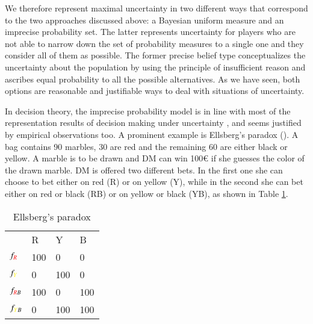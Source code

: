 \documentclass[fleqn,reqno,11pt]{article}
\begin{document}
We therefore represent maximal uncertainty in two different ways that correspond to the two
approaches discussed above: a Bayesian uniform measure and an imprecise probability
set. The latter represents uncertainty for players who are not able to narrow down the set of
probability measures to a single one and they consider all of them as possible. The former
precise belief type conceptualizes the uncertainty about the population by using the principle
of insufficient reason and ascribes equal probability to all the possible alternatives. As we
have seen, both options are reasonable and justifiable ways to deal with situations of
uncertainty.

In decision theory, the imprecise probability model is in line with most of the representation
results of decision making under uncertainty \citep[e.g.,][]{gilsch89,KlibMarMuk05,GhirMar02},
and seems justified by empirical observations too. A prominent example is Ellsberg's paradox
(\citet{ells61}). A bag contains 90 marbles, 30 are red and the remaining 60 are either black
or yellow. A marble is to be drawn and DM can win 100€ if she guesses the color of the drawn
marble. DM is offered two different bets. In the first one she can choose to bet either on
red (R) or on yellow (Y), while in the second she can bet either on red or black (RB) or on
yellow or black (YB), as shown in Table \ref{Ellsberg}.



\begin{table}[h]
\centering
\begin{tabular}{@{}llll@{}}
\cmidrule(l){2-4}
\multicolumn{1}{c}{} & {\color{red}R}   & {\color{yellow}Y}   & B   \\ \cmidrule(l){2-4} 
$f_{{\color{red}R}}$              & 100 & 0   & 0   \\
$f_{{\color{yellow}Y}}$              & 0   & 100 & 0   \\
$f_{{\color{red}R}B}$            & 100 & 0   & 100 \\
$f_{{\color{yellow}Y}B}$             & 0   & 100 & 100 \\ \bottomrule
\end{tabular}
\caption{Ellsberg's paradox}
\label{Ellsberg}
\end{table}
\end{document}
